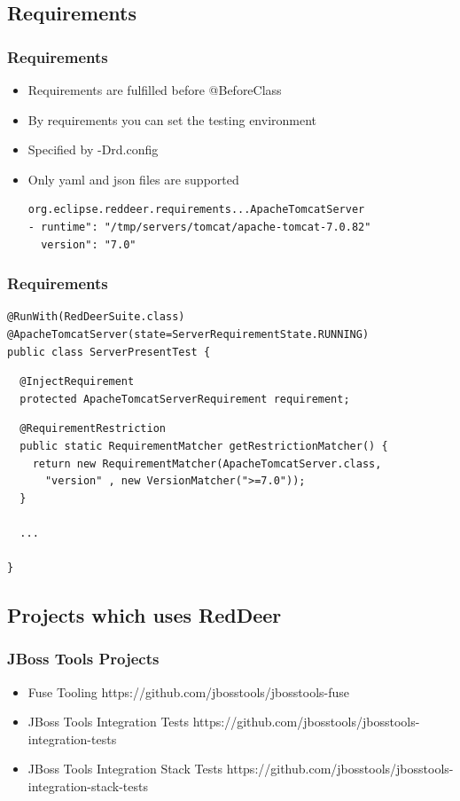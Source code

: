 \documentclass{beamer}
\begin{document}
\subsection{Requirements}
\begin{frame}[fragile]
\frametitle{Requirements}
\begin{itemize}
\item Requirements are fulfilled before @BeforeClass
\item By requirements you can set the testing environment
\item Specified by -Drd.config
\item Only yaml and json files are supported
\vspace{0.5cm}
\begin{verbatim}
org.eclipse.reddeer.requirements...ApacheTomcatServer
- runtime": "/tmp/servers/tomcat/apache-tomcat-7.0.82"
  version": "7.0"
\end{verbatim}
\end{itemize}
\end{frame}

\begin{frame}[fragile]
\frametitle{Requirements}
\begin{lstlisting}
@RunWith(RedDeerSuite.class)
@ApacheTomcatServer(state=ServerRequirementState.RUNNING)
public class ServerPresentTest {
\end{lstlisting}
\pause
\begin{lstlisting}
  @InjectRequirement
  protected ApacheTomcatServerRequirement requirement;
\end{lstlisting}
\pause
\begin{lstlisting}
  @RequirementRestriction
  public static RequirementMatcher getRestrictionMatcher() {
    return new RequirementMatcher(ApacheTomcatServer.class, 
      "version" , new VersionMatcher(">=7.0"));
  }

  ...

}
\end{lstlisting}
\end{frame}

\subsection{Projects which uses RedDeer}
\begin{frame}[fragile]
\frametitle{JBoss Tools Projects}
\begin{itemize}
\item Fuse Tooling \newline
  https://github.com/jbosstools/jbosstools-fuse
\item JBoss Tools Integration Tests \newline
  https://github.com/jbosstools/jbosstools-integration-tests
\item JBoss Tools Integration Stack Tests \newline
  https://github.com/jbosstools/jbosstools-integration-stack-tests
\end{itemize}
\end{frame}
\end{document}
